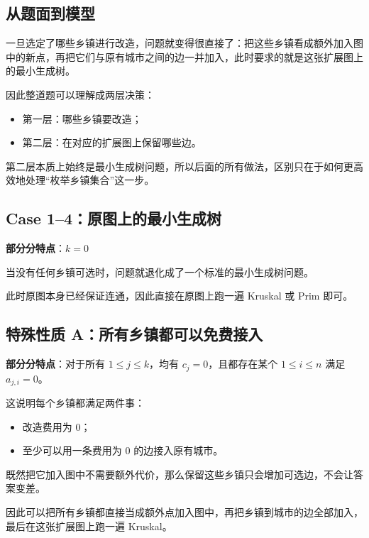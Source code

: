 \documentclass{book}
\begin{document}
\subsection{从题面到模型}

一旦选定了哪些乡镇进行改造，问题就变得很直接了：把这些乡镇看成额外加入图中的新点，再把它们与原有城市之间的边一并加入，此时要求的就是这张扩展图上的最小生成树。

因此整道题可以理解成两层决策：

\begin{itemize}[leftmargin=2em,itemsep=1pt,topsep=2pt,parsep=0pt,partopsep=0pt]
    \item 第一层：哪些乡镇要改造；
    \item 第二层：在对应的扩展图上保留哪些边。
\end{itemize}

第二层本质上始终是最小生成树问题，所以后面的所有做法，区别只在于如何更高效地处理“枚举乡镇集合”这一步。

\subsection{Case 1--4：原图上的最小生成树}

\textbf{部分分特点}：$k=0$

当没有任何乡镇可选时，问题就退化成了一个标准的最小生成树问题。

此时原图本身已经保证连通，因此直接在原图上跑一遍 Kruskal 或 Prim 即可。

\subsection{特殊性质 A：所有乡镇都可以免费接入}

\textbf{部分分特点}：对于所有 $1 \leq j \leq k$，均有 $c_j = 0$，且都存在某个 $1 \leq i \leq n$ 满足 $a_{j,i} = 0$。

这说明每个乡镇都满足两件事：
\begin{itemize}[leftmargin=2em,itemsep=1pt,topsep=2pt,parsep=0pt,partopsep=0pt]
    \item 改造费用为 $0$；
    \item 至少可以用一条费用为 $0$ 的边接入原有城市。
\end{itemize}

既然把它加入图中不需要额外代价，那么保留这些乡镇只会增加可选边，不会让答案变差。

因此可以把所有乡镇都直接当成额外点加入图中，再把乡镇到城市的边全部加入，最后在这张扩展图上跑一遍 Kruskal。
\end{document}
